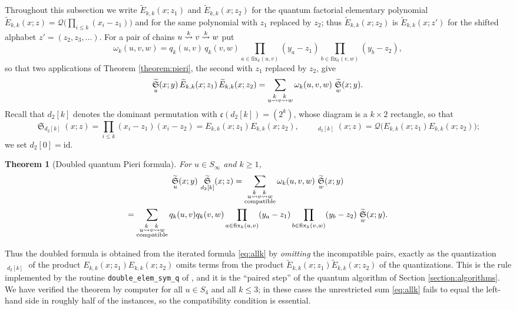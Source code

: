 \documentclass{amsart}
\newtheorem{theorem}[lemma]{Theorem}
\theoremstyle{definition}
\theoremstyle{remark}
\numberwithin{equation}{section}
\DeclareMathOperator{\sch}{\mathfrak{S}}
\DeclareMathOperator{\qsch}{\widetilde{\mathfrak{S}}}
\newcommand{\xrightsquigarrow}[2][]{%
	\mathrel{\mathop{\rightsquigarrow}\limits^{\scriptstyle #2}%
	\ifx\hfuzz#1\hfuzz\else_{\scriptstyle #1}\fi}%
}
\newcommand{\tom}[1]{\ensuremath{\xrightsquigarrow{#1}}}
\newcommand{\fx}{\mathrm{fix}}
\newcommand{\code}{\mathfrak{c}}
\newcommand{\qelem}{\widetilde{E}}
\begin{document}
Throughout this subsection we write $\qelem_{k,k}(x;z_1)$ and $\qelem_{k,k}(x;z_2)$ for the quantum factorial elementary polynomial $\qelem_{k,k}(x;z)=\mathcal Q\big(\prod_{i\leq k}(x_i-z_1)\big)$ and for the same polynomial with $z_1$ replaced by $z_2$; thus $\qelem_{k,k}(x;z_2)$ is $\qelem_{k,k}(x;z')$ for the shifted alphabet $z'=(z_2,z_3,\ldots)$. For a pair of chains $u\tom{k}v\tom{k}w$ put
$$\omega_k(u,v,w)=q_k(u,v)\,q_k(v,w)\prod_{a\in\fx_k(u,v)}(y_a-z_1)\prod_{b\in\fx_k(v,w)}(y_b-z_2),$$
so that two applications of Theorem \ref{theorem:pieri}, the second with $z_1$ replaced by $z_2$, give
\begin{equation}\label{eq:allk}
\qsch_u(x;y)\,\qelem_{k,k}(x;z_1)\,\qelem_{k,k}(x;z_2)=\sum_{u\tom{k}v\tom{k}w}\omega_k(u,v,w)\,\qsch_w(x;y).
\end{equation}
Recall that $d_2[k]$ denotes the dominant permutation with $\code(d_2[k])=(2^k)$, whose diagram is a $k\times2$ rectangle, so that
$$\sch_{d_2[k]}(x;z)=\prod_{i\leq k}(x_i-z_1)(x_i-z_2)=E_{k,k}(x;z_1)E_{k,k}(x;z_2),\qquad \qsch_{d_2[k]}(x;z)=\mathcal Q\big(E_{k,k}(x;z_1)E_{k,k}(x;z_2)\big);$$
we set $d_2[0]=\mathrm{id}$.

\begin{theorem}[Doubled quantum Pieri formula] \label{theorem:doubledpieri}
For $u\in S_\infty$ and $k\geq1$,
\begin{multline*}
\qsch_u(x;y)\,\qsch_{d_2[k]}(x;z)=\sum_{\substack{u\tom{k}v\tom{k}w\\ \text{compatible}}}\omega_k(u,v,w)\,\qsch_w(x;y)\\
=\sum_{\substack{u\tom{k}v\tom{k}w\\ \text{compatible}}}q_k(u,v)q_k(v,w)\prod_{a\in\fx_k(u,v)}(y_a-z_1)\prod_{b\in\fx_k(v,w)}(y_b-z_2)\,\qsch_w(x;y).
\end{multline*}
\end{theorem}

Thus the doubled formula is obtained from the iterated formula \eqref{eq:allk} by \emph{omitting} the incompatible pairs, exactly as the quantization $\qsch_{d_2[k]}$ of the product $E_{k,k}(x;z_1)E_{k,k}(x;z_2)$ omits terms from the product $\qelem_{k,k}(x;z_1)\qelem_{k,k}(x;z_2)$ of the quantizations. This is the rule implemented by the routine \texttt{double\_elem\_sym\_q} of \cite{schubmult}, and it is the ``paired step'' of the quantum algorithm of Section \ref{section:algorithms}. We have verified the theorem by computer for all $u\in S_4$ and all $k\leq3$; in these cases the unrestricted sum \eqref{eq:allk} fails to equal the left-hand side in roughly half of the instances, so the compatibility condition is essential.
\end{document}
